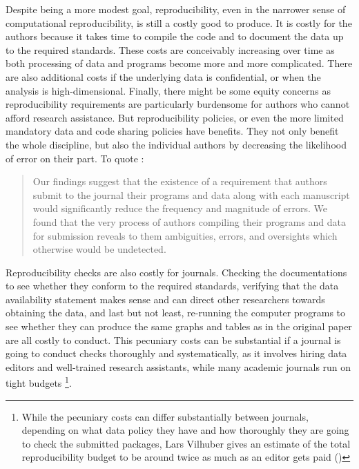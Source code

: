\documentclass[11pt]{article}
\begin{document}
Despite being a more modest goal, reproducibility, even in the narrower sense of computational reproducibility, is still a costly good to produce. It is costly for the authors because it takes time to compile the code and to document the data up to the required standards. %
These costs are conceivably increasing over time as both processing of data and programs become more and more complicated. There are also additional costs if the underlying data is confidential, or when the analysis is high-dimensional. Finally, there might be some equity concerns as reproducibility requirements are particularly burdensome for authors who cannot afford research assistance. But reproducibility policies, or even the more limited mandatory data and code sharing policies have benefits. They not only benefit the whole discipline, but also the individual authors by decreasing the likelihood of error on their part. To quote \cite{dewald1986replication}:
\begin{quotation}
	Our findings suggest that the existence
	of a requirement that authors submit to the
	journal their programs and data along with
	each manuscript would significantly reduce
	the frequency and magnitude of errors. We
	found that the very process of authors compiling their programs and data for submission reveals to them ambiguities, errors,
	and oversights which otherwise would be undetected.\\
\end{quotation}

Reproducibility checks are also costly for journals. Checking the documentations to see whether they conform to the required standards, verifying that the data availability statement makes sense and can direct other researchers towards obtaining the data, and last but not least, re-running the computer programs to see whether they can produce the same graphs and tables as in the original paper are all costly to conduct. This pecuniary costs can be substantial if a journal is going to conduct checks thoroughly and systematically, as it involves hiring data editors and well-trained research assistants, while many academic journals run on tight budgets \footnote{While the pecuniary costs can differ substantially between journals, depending on what data policy they have and how thoroughly they are going to check the submitted packages, Lars Vilhuber gives an estimate of the total reproducibility budget to be around twice as much as an editor gets paid (\cite{crress2022session1})}.\\
\end{document}
